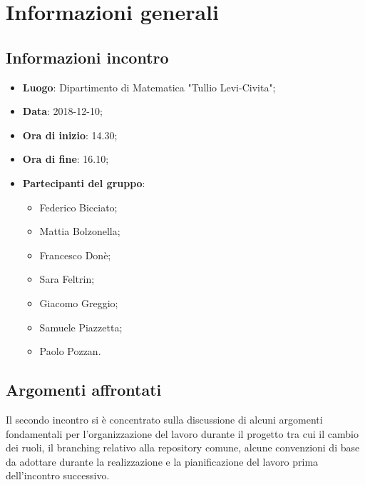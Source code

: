 \section{Informazioni generali}

\subsection{Informazioni incontro}
\begin{itemize}
\item \textbf{Luogo}: Dipartimento di Matematica "Tullio Levi-Civita";
\item \textbf{Data}: 2018-12-10;
\item \textbf{Ora di inizio}: 14.30;
\item \textbf{Ora di fine}: 16.10;
\item \textbf{Partecipanti del gruppo}:
\begin{itemize}
	\item Federico Bicciato;
	\item Mattia Bolzonella;
	\item Francesco Donè;
	\item Sara Feltrin;
	\item Giacomo Greggio;
	\item Samuele Piazzetta;
	\item Paolo Pozzan.
\end{itemize}
\end{itemize}

\subsection{Argomenti affrontati}
Il secondo incontro si è concentrato sulla discussione di alcuni argomenti fondamentali per l'organizzazione del lavoro durante il progetto tra cui il cambio dei ruoli, il branching relativo alla repository comune, alcune convenzioni di base da adottare durante la realizzazione e la pianificazione del lavoro prima dell'incontro successivo.
